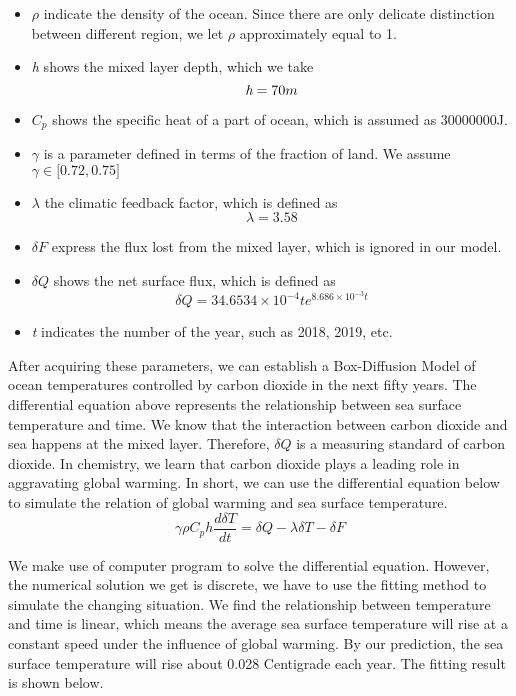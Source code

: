 \documentclass{mcmthesis}
\begin{document}
\begin{itemize}
	\item $\rho$ indicate the density of the ocean. Since there are only delicate distinction between different region, we let $\rho$ approximately equal to 1. 
	\item \emph{h} shows the mixed layer depth, which we take
		\begin{equation*}
		\emph{h}  = 70m
		\end {equation*}
	\item $C_p$ shows the specific heat of a part of ocean, which is assumed as 30000000J.
	\item $\gamma$ is a parameter defined in terms of the fraction of land. We assume $\gamma \in \big[0.72,0.75\big]$ 
	\item $\lambda$ the climatic feedback factor, which is defined as 
		\begin{equation*}
		\lambda = 3.58
		\end {equation*}
	\item  $\delta F$ express the flux lost from the mixed layer, which is ignored in our model. 
		
	\item $\delta Q$ shows the net surface flux, which is defined as
		\begin{equation*}
		\delta Q = 34.6534 \times 10^{-4}te^{8.686\times 10^{-3}t}
		\end {equation*}
	\item \emph{t} indicates the number of the year, such as 2018, 2019, etc.
\end{itemize}
\par
	After acquiring these parameters, we can establish a Box-Diffusion Model of ocean temperatures controlled by carbon dioxide in the next fifty years. The differential equation above represents the relationship between sea surface temperature and time. We know that the interaction between carbon dioxide and sea happens at the mixed layer. Therefore, $\delta Q$ is a measuring standard of carbon dioxide. In chemistry, we learn that carbon dioxide plays a leading role in aggravating global warming. In short, we can use the differential equation below to simulate  the relation of global warming and sea surface temperature.
\begin{equation*}\label{set1}
\gamma\rho C_{p} h\frac{d\delta T}{dt} = \delta Q - \lambda\delta T - \delta F
\end{equation*}
\par
	We make use of computer program to solve the differential equation. However, the numerical solution we get is discrete, we have to use the fitting method to simulate the changing situation. We find the relationship between temperature and time is linear, which means the average sea surface temperature will rise at a constant speed under the influence of global warming. By our prediction, the sea surface temperature will rise about 0.028 Centigrade each year. The fitting result is shown below.
\par
\end{document}
